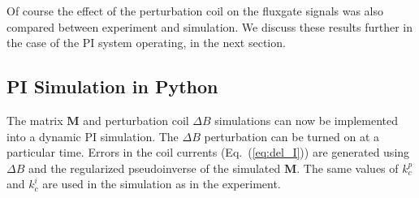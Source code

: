 





Of course the effect of the perturbation coil on the fluxgate signals
was also compared between experiment and simulation.  We discuss these
results further in the case of the PI system operating, in the next
section.


\subsection{PI Simulation in Python}

The matrix $\bm{M}$ and perturbation coil $\Delta B$ simulations can
now be implemented into a dynamic PI simulation.  The $\Delta B$
perturbation can be turned on at a particular time.  Errors in the
coil currents (Eq.~(\ref{eq:del_I})) are generated using $\Delta B$
and the regularized pseudoinverse of the simulated $\bm{M}$. The same values
of $k_c^p$ and $k_c^i$ are used in the simulation as in the experiment.

